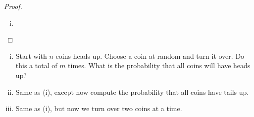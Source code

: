 \documentclass[11pt]{scrartcl}
\begin{document}
\begin{proof}
    \begin{enumerate}[(i)]
        \item 
    \end{enumerate}
\end{proof}
\begin{problem}
\phantom{0}
\begin{enumerate}[(i)]
    \item Start with $n$ coins heads up. Choose a coin at random and turn it over. Do this a total of $m$ times. What is the probability that all coins will have heads up?
    \item Same as (i), except now compute the probability that all coins have tails up.
    \item Same as (i), but now we turn over two coins at a time.
\end{enumerate}
\end{problem}
\end{document}
